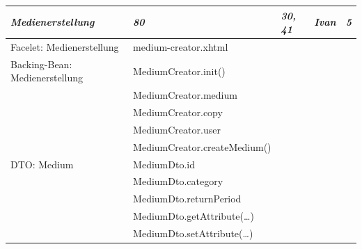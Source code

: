 \documentclass{article}
\begin{document}
\begin{longtable}{|l|l|l|l|l|}
\hline
\textbf{\textit{Medienerstellung}}      & \textbf{\textit{80}}                     & \textbf{\textit{30, 41}}  & \textbf{\textit{Ivan}}      & \textbf{\textit{5}}    \\ 
\hline
Facelet: Medienerstellung               & medium-creator.xhtml                     &                           &                             &                        \\ 
\hline
Backing-Bean: Medienerstellung          & MediumCreator.init()                     &                           &                             &                        \\ 
\hline
                                        & MediumCreator.medium                     &                           &                             &                        \\ 
\hline
                                        & MediumCreator.copy                       &                           &                             &                        \\ 
\hline
                                        & MediumCreator.user                       &                           &                             &                        \\ 
\hline
                                        & MediumCreator.createMedium()             &                           &                             &                        \\ 
\hline
DTO: Medium                             & MediumDto.id                             &                           &                             &                        \\ 
\hline
                                        & MediumDto.category                       &                           &                             &                        \\ 
\hline
                                        & MediumDto.returnPeriod                   &                           &                             &                        \\ 
\hline
                                        & MediumDto.getAttribute(…)                &                           &                             &                        \\ 
\hline
                                        & MediumDto.setAttribute(…)                &                           &                             &                        \\ 

\end{longtable}
\end{document}
